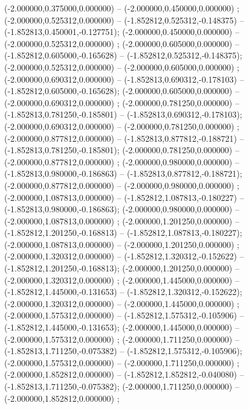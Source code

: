  (-2.000000,0.375000,0.000000) -- (-2.000000,0.450000,0.000000) ;
 (-2.000000,0.525312,0.000000) -- (-1.852812,0.525312,-0.148375) -- (-1.852813,0.450001,-0.127751);
 (-2.000000,0.450000,0.000000) -- (-2.000000,0.525312,0.000000) ;
 (-2.000000,0.605000,0.000000) -- (-1.852812,0.605000,-0.165628) -- (-1.852812,0.525312,-0.148375);
 (-2.000000,0.525312,0.000000) -- (-2.000000,0.605000,0.000000) ;
 (-2.000000,0.690312,0.000000) -- (-1.852813,0.690312,-0.178103) -- (-1.852812,0.605000,-0.165628);
 (-2.000000,0.605000,0.000000) -- (-2.000000,0.690312,0.000000) ;
 (-2.000000,0.781250,0.000000) -- (-1.852813,0.781250,-0.185801) -- (-1.852813,0.690312,-0.178103);
 (-2.000000,0.690312,0.000000) -- (-2.000000,0.781250,0.000000) ;
 (-2.000000,0.877812,0.000000) -- (-1.852813,0.877812,-0.188721) -- (-1.852813,0.781250,-0.185801);
 (-2.000000,0.781250,0.000000) -- (-2.000000,0.877812,0.000000) ;
 (-2.000000,0.980000,0.000000) -- (-1.852813,0.980000,-0.186863) -- (-1.852813,0.877812,-0.188721);
 (-2.000000,0.877812,0.000000) -- (-2.000000,0.980000,0.000000) ;
 (-2.000000,1.087813,0.000000) -- (-1.852812,1.087813,-0.180227) -- (-1.852813,0.980000,-0.186863);
 (-2.000000,0.980000,0.000000) -- (-2.000000,1.087813,0.000000) ;
 (-2.000000,1.201250,0.000000) -- (-1.852812,1.201250,-0.168813) -- (-1.852812,1.087813,-0.180227);
 (-2.000000,1.087813,0.000000) -- (-2.000000,1.201250,0.000000) ;
 (-2.000000,1.320312,0.000000) -- (-1.852812,1.320312,-0.152622) -- (-1.852812,1.201250,-0.168813);
 (-2.000000,1.201250,0.000000) -- (-2.000000,1.320312,0.000000) ;
 (-2.000000,1.445000,0.000000) -- (-1.852812,1.445000,-0.131653) -- (-1.852812,1.320312,-0.152622);
 (-2.000000,1.320312,0.000000) -- (-2.000000,1.445000,0.000000) ;
 (-2.000000,1.575312,0.000000) -- (-1.852812,1.575312,-0.105906) -- (-1.852812,1.445000,-0.131653);
 (-2.000000,1.445000,0.000000) -- (-2.000000,1.575312,0.000000) ;
 (-2.000000,1.711250,0.000000) -- (-1.852813,1.711250,-0.075382) -- (-1.852812,1.575312,-0.105906);
 (-2.000000,1.575312,0.000000) -- (-2.000000,1.711250,0.000000) ;
 (-2.000000,1.852812,0.000000) -- (-1.852812,1.852812,-0.040080) -- (-1.852813,1.711250,-0.075382);
 (-2.000000,1.711250,0.000000) -- (-2.000000,1.852812,0.000000) ;
